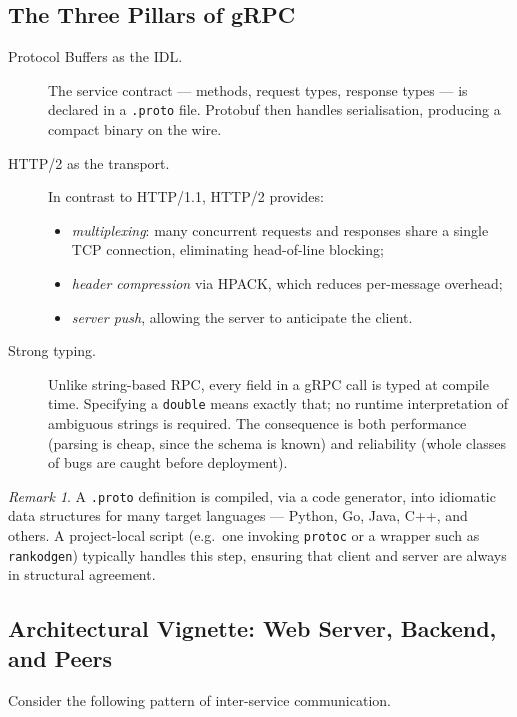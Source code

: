 \documentclass[11pt,a4paper]{article}
\theoremstyle{definition}
\theoremstyle{remark}
\newtheorem*{remark}{Remark}
\begin{document}
\subsection{The Three Pillars of gRPC}

\begin{description}
    \item[Protocol Buffers as the IDL.] The service contract --- methods, request types, response types --- is declared in a \texttt{.proto} file. Protobuf then handles serialisation, producing a compact binary on the wire.

    \item[HTTP/2 as the transport.] In contrast to HTTP/1.1, HTTP/2 provides:
    \begin{itemize}
        \item \emph{multiplexing}: many concurrent requests and responses share a single TCP connection, eliminating head-of-line blocking;
        \item \emph{header compression} via HPACK, which reduces per-message overhead;
        \item \emph{server push}, allowing the server to anticipate the client.
    \end{itemize}

    \item[Strong typing.] Unlike string-based RPC, every field in a gRPC call is typed at compile time. Specifying a \texttt{double} means exactly that; no runtime interpretation of ambiguous strings is required. The consequence is both performance (parsing is cheap, since the schema is known) and reliability (whole classes of bugs are caught before deployment).
\end{description}

\begin{remark}
A \texttt{.proto} definition is compiled, via a code generator, into idiomatic data structures for many target languages --- Python, Go, Java, C++, and others. A project-local script (e.g.\ one invoking \texttt{protoc} or a wrapper such as \texttt{rankodgen}) typically handles this step, ensuring that client and server are always in structural agreement.
\end{remark}

\subsection{Architectural Vignette: Web Server, Backend, and Peers}

Consider the following pattern of inter-service communication.
\end{document}
